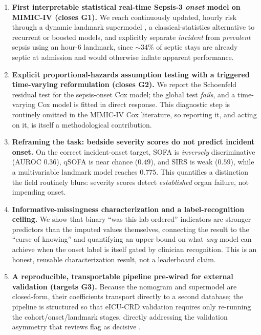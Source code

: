 \documentclass[conference]{IEEEtran}
\begin{document}
\begin{enumerate}
\item[\textbf{C1.}] \textbf{First interpretable statistical real-time Sepsis-3
\emph{onset} model on MIMIC-IV (closes G1).} We reach continuously updated,
hourly risk through a dynamic landmark supermodel
\cite{vanhouwelingen2007landmark,fries2023dynamiclm}, a classical-statistics
alternative to recurrent or boosted models, and explicitly separate
\emph{incident} from \emph{prevalent} sepsis using an hour-6 landmark, since
$\sim$34\% of septic stays are already septic at admission and would otherwise
inflate apparent performance.

\item[\textbf{C2.}] \textbf{Explicit proportional-hazards assumption testing with
a triggered time-varying reformulation (closes G2).} We report the Schoenfeld
residual test for the sepsis-onset Cox model; the global test \emph{fails}, and
a time-varying Cox model is fitted in direct response. This diagnostic step is
routinely omitted in the MIMIC-IV Cox literature, so reporting it, and acting
on it, is itself a methodological contribution.

\item[\textbf{C3.}] \textbf{Reframing the task: bedside severity scores do not
predict incident onset.} On the correct incident-onset target, SOFA is
\emph{inversely} discriminative (AUROC $0.36$), qSOFA is near chance ($0.49$),
and SIRS is weak ($0.59$), while a multivariable landmark model reaches
$0.775$. This quantifies a distinction the field routinely blurs: severity
scores detect \emph{established} organ failure, not impending onset.

\item[\textbf{C4.}] \textbf{Informative-missingness characterization and a
label-recognition ceiling.} We show that binary ``was this lab ordered''
indicators are stronger predictors than the imputed values themselves,
connecting the result to the ``curse of knowing''
\cite{groenwold2020missingness,singh2021missingness} and quantifying an upper
bound on what \emph{any} model can achieve when the onset label is itself gated
by clinician recognition. This is an honest, reusable characterization result,
not a leaderboard claim.

\item[\textbf{C5.}] \textbf{A reproducible, transportable pipeline pre-wired for
external validation (targets G3).} Because the nomogram and supermodel are
closed-form, their coefficients transport directly to a second database; the
pipeline is structured so that eICU-CRD \cite{pollard2018eicu} validation
requires only re-running the cohort/onset/landmark stages, directly addressing
the validation asymmetry that reviews flag as decisive \cite{wang2025srpm}.
\end{enumerate}
\end{document}

